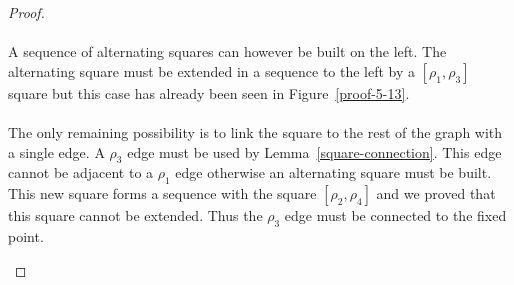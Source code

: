 \begin{proof}
\paragraph{}
A sequence of alternating squares can however be built on the left. The alternating square must be extended in a sequence to the left by a $[\rho_1, \rho_3]$ square but this case has already been seen in Figure~\ref{proof-5-13}.

\paragraph{}
The only remaining possibility is to link the square to the rest of the graph with a single edge. A $\rho_3$ edge must be used by Lemma~\ref{square-connection}. This edge cannot be adjacent to a $\rho_1$ edge otherwise an alternating square must be built. This new square forms a sequence with the square $[\rho_2, \rho_4]$ and we proved that this square cannot be extended. Thus the $\rho_3$ edge must be connected to the fixed point.

\begin{figure}[H]
  \begin{center}
\end{center}
\end{figure}
\end{proof}
